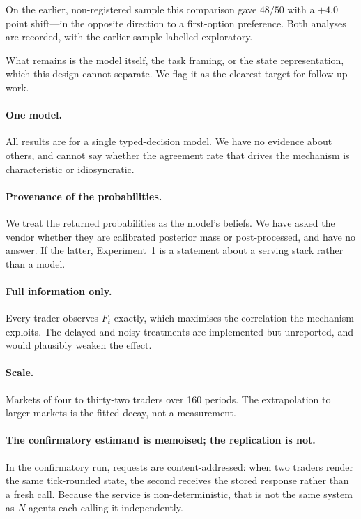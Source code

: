 \documentclass[11pt]{article}
\begin{document}
On the earlier, non-registered sample this comparison gave $48/50$ with a
$+4.0$ point shift---in the opposite direction to a first-option preference.
Both analyses are recorded, with the earlier sample labelled exploratory.

What remains is the model itself, the task framing, or the state
representation, which this design cannot separate. We flag it as the clearest
target for follow-up work.

\paragraph{One model.} All results are for a single typed-decision model. We
have no evidence about others, and cannot say whether the agreement rate that
drives the mechanism is characteristic or idiosyncratic.

\paragraph{Provenance of the probabilities.} We treat the returned
probabilities as the model's beliefs. We have asked the vendor whether they are
calibrated posterior mass or post-processed, and have no answer. If the latter,
Experiment~1 is a statement about a serving stack rather than a model.

\paragraph{Full information only.} Every trader observes $F_t$ exactly, which
maximises the correlation the mechanism exploits. The delayed and noisy
treatments are implemented but unreported, and would plausibly weaken the
effect.

\paragraph{Scale.} Markets of four to thirty-two traders over 160 periods. The
extrapolation to larger markets is the fitted decay, not a measurement.

\paragraph{The confirmatory estimand is memoised; the replication is not.}
\label{sec:estimand}
In the confirmatory run, requests are
content-addressed: when two traders render the same tick-rounded state, the
second receives the stored response rather than a fresh call. Because the
service is non-deterministic, that is not the same system as $N$ agents each
calling it independently.
\end{document}
